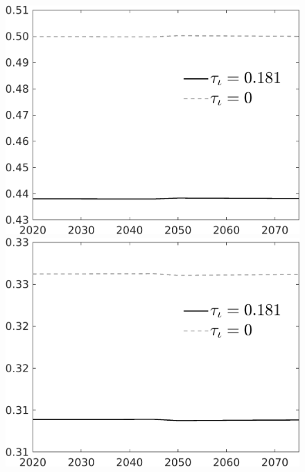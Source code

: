 \documentclass[12pt]{article}
\begin{document}
\begin{figure}[h!!]
\begin{minipage}[]{0.32\textwidth}
\end{minipage}	
\begin{minipage}[]{0.32\textwidth}
\includegraphics[width=1\textwidth]{../../codding_model/own_basedOnFried/optimalPol_010922_revision/figures/all_13Sept22/CompTauf_bytaul_Reg0_hh_spillover0_nsk0_xgr0_knspil1_sep1_LFlimit1_emsbase0_countec0_GovRev0_etaa0.79_lgd1.png}
\end{minipage}	
\begin{minipage}[]{0.32\textwidth}
\includegraphics[width=1\textwidth]{../../codding_model/own_basedOnFried/optimalPol_010922_revision/figures/all_13Sept22/CompTauf_bytaul_Reg0_hl_spillover0_nsk0_xgr0_knspil1_sep1_LFlimit1_emsbase0_countec0_GovRev0_etaa0.79_lgd1.png}

\end{minipage}
\end{figure}
\end{document}
